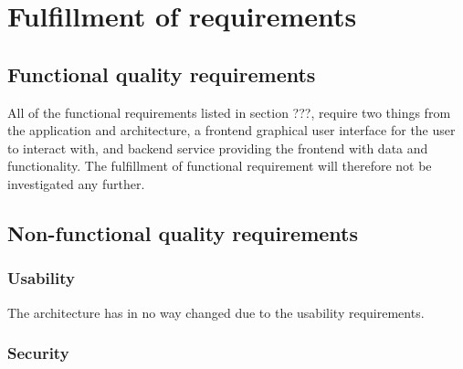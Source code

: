 \section{Fulfillment of requirements}

\subsection{Functional quality requirements}
All of the functional requirements listed in section ???, require two things from the application and architecture, a frontend graphical user interface for the user to interact with, and backend service providing the frontend with data and functionality. The fulfillment of functional requirement will therefore not be investigated any further.

\subsection{Non-functional quality requirements}

\subsubsection{Usability}
The architecture has in no way changed due to the usability requirements. 

\subsubsection{Security}

